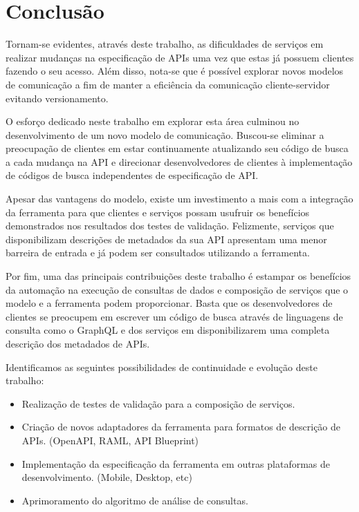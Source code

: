 \chapter{Conclusão}

Tornam-se evidentes, através deste trabalho, as dificuldades de serviços em realizar mudanças na especificação de APIs uma vez que estas já possuem clientes fazendo o seu acesso. Além disso, nota-se que é possível explorar novos modelos de comunicação a fim de manter a eficiência da comunicação cliente-servidor evitando versionamento.

O esforço dedicado neste trabalho em explorar esta área culminou no desenvolvimento de um novo modelo de comunicação. Buscou-se eliminar a preocupação de clientes em estar continuamente atualizando seu código de busca a cada mudança na API e direcionar desenvolvedores de clientes à implementação de códigos de busca independentes de especificação de API.

Apesar das vantagens do modelo, existe um investimento a mais com a integração da ferramenta para que clientes e serviços possam usufruir os benefícios demonstrados nos resultados dos testes de validação. Felizmente, serviços que disponibilizam descrições de metadados da sua API apresentam uma menor barreira de entrada e já podem ser consultados utilizando a ferramenta.

Por fim, uma das principais contribuições deste trabalho é estampar os benefícios da automação na execução de consultas de dados e composição de serviços que o modelo e a ferramenta podem proporcionar. Basta que os desenvolvedores de clientes se preocupem em escrever um código de busca através de linguagens de consulta como o GraphQL e dos serviços em disponibilizarem uma completa descrição dos metadados de APIs.



Identificamos as seguintes possibilidades de continuidade e evolução deste trabalho: 

\begin{itemize}
\item Realização de testes de validação para a composição de serviços.
\item Criação de novos adaptadores da ferramenta para formatos de descrição de APIs. (OpenAPI, RAML, API Blueprint)
\item Implementação da especificação da ferramenta em outras plataformas de desenvolvimento. (Mobile, Desktop, etc)
\item Aprimoramento do algoritmo de análise de consultas.
\end{itemize}
